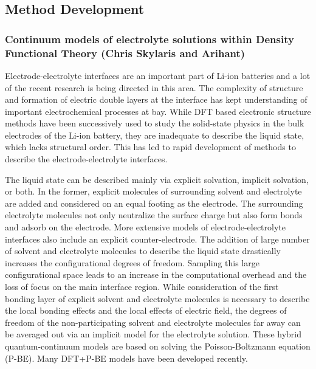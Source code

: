 \documentclass[journal=jacsat,manuscript=article]{achemso}
\newcommand*{\pbe}{P-BE}
\begin{document}
\subsection{Method Development}

\subsubsection{Continuum models of electrolyte solutions within Density Functional Theory (Chris Skylaris and Arihant)}
\label{sec:dft+cont}
Electrode-electrolyte interfaces are an important part of Li-ion batteries and a lot of the recent research is being directed in this area.\cite{Gauthier2015, Yu2018} The complexity of structure and formation of electric double layers at the interface has kept understanding of important electrochemical processes at bay. While DFT based electronic structure methods have been successively used to study the solid-state physics in the bulk electrodes of the Li-ion battery, they are inadequate to describe the liquid state, which lacks structural order. This has led to rapid development of methods to describe the electrode-electrolyte interfaces.\cite{Jinnouchi2018} 

The liquid state can be described mainly via explicit solvation,\cite{Hansen2016} implicit solvation,\cite{Sakong2015} or both.\cite{Skyner2015} In the former, explicit molecules of surrounding solvent and electrolyte are added and considered on an equal footing as the electrode. The surrounding electrolyte molecules not only neutralize the surface charge but also form bonds and adsorb on the electrode.\cite{Kang2011} More extensive models of electrode-electrolyte interfaces also include an explicit counter-electrode.\cite{Dufils2019, Jorn2013} The addition of large number of solvent and electrolyte molecules to describe the liquid state drastically increases the configurational degrees of freedom. Sampling this large configurational space leads to an increase in the computational overhead and the loss of focus on the main interface region. While consideration of the first bonding layer of explicit solvent and electrolyte molecules is necessary to describe the local bonding effects and the local effects of electric field,\cite{Zhang2020} the degrees of freedom of the non-participating solvent and electrolyte molecules far away can be averaged out via an implicit model for the electrolyte solution.\cite{Cramer1999, Tomasi2005}  These hybrid quantum-continuum models are based on solving the  Poisson-Boltzmann equation (\pbe).\cite{Grochowski2008} Many DFT+\pbe{} models have been developed recently.\cite{Jinnouchi2008, Gunceler2013, Ringe2016, Nattino2019, Melander2019, Stein2019, DLMG2018, Dziedzic2020, neutralization-paper}
\end{document}
